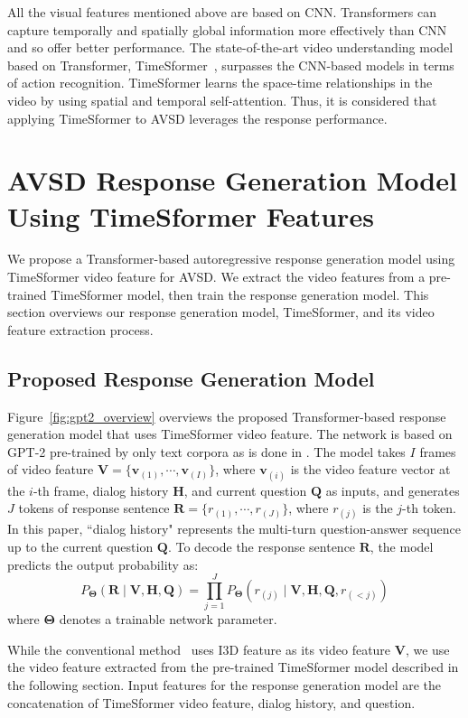 \documentclass[letterpaper]{article}
\begin{document}
All the visual features mentioned above are based on CNN.
Transformers can capture temporally and spatially global information more effectively than CNN and so offer better performance.
The state-of-the-art video understanding model based on Transformer, TimeSformer~\cite{Bertasius2021is}, surpasses the CNN-based models in terms of action recognition.
TimeSformer learns the space-time relationships in the video by using spatial and temporal self-attention.
Thus, it is considered that applying TimeSformer to AVSD leverages the response performance.


\section{AVSD Response Generation Model Using TimeSformer Features}
We propose a Transformer-based autoregressive response generation model using TimeSformer video feature for AVSD.
We extract the video features from a pre-trained TimeSformer model, then train the response generation model.
This section overviews our response generation model, TimeSformer, and its video feature extraction process.

\subsection{Proposed Response Generation Model}
Figure~\ref{fig:gpt2_overview} overviews the proposed Transformer-based response generation model that uses TimeSformer video feature.
The network is based on GPT-2 pre-trained by only text corpora as is done in \citet{Li2021bridging}.
The model takes $I$ frames of video feature $\bm{V} = \{\bm{v}_{(1)}, \cdots , \bm{v}_{(I)}\}$, where $\bm{v}_{(i)}$ is the video feature vector at the $i$-th frame, dialog history $\bm{H}$, and current question $\bm{Q}$ as inputs, and generates $J$ tokens of response sentence $\bm{R} = \{r_{(1)}, \cdots , r_{(J)}\}$, where $r_{(j)}$ is the $j$-th token.
In this paper, ``dialog history" represents the multi-turn question-answer sequence up to the current question $\bm{Q}$.
To decode the response sentence $\bm{R}$, the model predicts the output probability as:
\begin{equation}
  P_{\bm{\Theta}}(\bm{R} \mid \bm{V}, \bm{H}, \bm{Q}) = \prod^{J}_{j=1}P_{\bm{\Theta}}(r_{(j)} \mid \bm{V}, \bm{H}, \bm{Q}, r_{(<j)})
\end{equation}
where $\bm{\Theta}$ denotes a trainable network parameter.

While the conventional method~\cite{Li2021bridging} uses I3D feature as its video feature $\bm{V}$, we use the video feature extracted from the pre-trained TimeSformer model described in the following section.
Input features for the response generation model are the concatenation of TimeSformer video feature, dialog history, and question.
\end{document}
